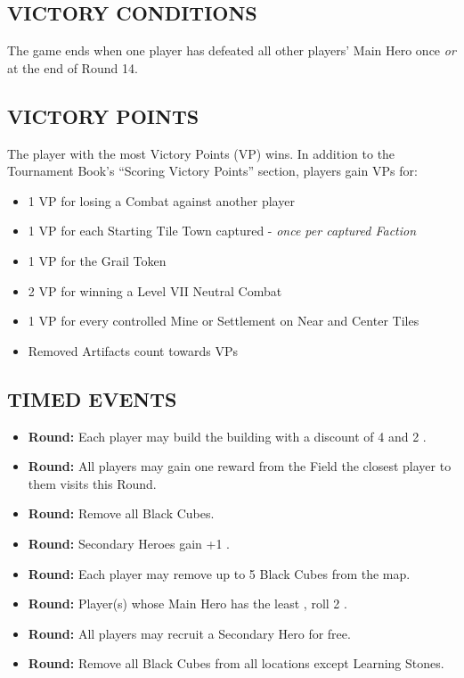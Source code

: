 \begin{multicols*}{2}
\subsection*{\MakeUppercase{Victory Conditions}}
The game ends when one player has defeated all other players' Main Hero once \textit{or} at the end of Round 14.

\subsection*{\MakeUppercase{Victory Points}}
The player with the most Victory Points (VP) wins.
In addition to the Tournament Book's ``Scoring Victory Points'' section, players gain VPs for:

\begin{itemize}
  \item 1 VP for losing a Combat against another player
  \item 1 VP for each Starting Tile Town captured - \textit{once per captured Faction}
  \item 1 VP for the Grail Token
  \item 2 VP for winning a Level VII Neutral Combat
  \item 1 VP for every controlled Mine or Settlement on Near and Center Tiles
  \item Removed Artifacts count towards VPs
\end{itemize}

\subsection*{\MakeUppercase{Timed Events}}

\begin{itemize}
  \item[\textbf{\nth{1}}] \textbf{Round:} Each player may build the  building with a discount of 4  and 2 .
  \item[\textbf{\nth{2}}] \textbf{Round:} All players may gain one reward from the Field the closest player to them visits this Round.
  \item[\textbf{\nth{4}}] \textbf{Round:} Remove all Black Cubes.
  \item[\textbf{\nth{6}}] \textbf{Round:} Secondary Heroes gain +1 .
  \item[\textbf{\nth{8}}] \textbf{Round:} Each player may remove up to 5 Black Cubes from the map.
  \item[\textbf{\nth{9}}] \textbf{Round:} Player(s) whose Main Hero has the least , roll 2 .
  \item[\textbf{\nth{10}}] \textbf{Round:} All players may recruit a Secondary Hero for free.
  \item[\textbf{\nth{12}}] \textbf{Round:} Remove all Black Cubes from all locations except Learning Stones.
\end{itemize}


\end{multicols*}
